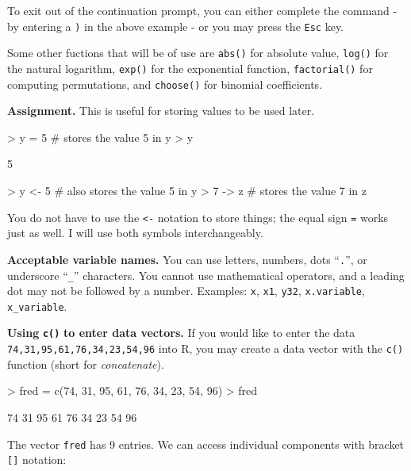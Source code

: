 \documentclass[english]{article}
\renewenvironment{Schunk}{\vspace{\topsep}}{\vspace{\topsep}}
\begin{document}
To exit out of the continuation prompt, you can either complete the
command - by entering a \texttt{)} in the above example
- or you may press the \texttt{Esc} key.

Some other fuctions that will be of use are \texttt{abs()} for absolute
value, \texttt{log()} for the natural logarithm, \texttt{exp()} for
the exponential function, \texttt{factorial()} for computing permutations,
and \texttt{choose()} for binomial coefficients.

\textbf{Assignment.} This is useful for storing values to be used
later.

\begin{Schunk}
\begin{Sinput}
> y = 5    # stores the value 5 in y
> y
\end{Sinput}
\begin{Soutput}
[1] 5
\end{Soutput}
\begin{Sinput}
> y <- 5   # also stores the value 5 in y
> 7 -> z   # stores the value 7 in z
\end{Sinput}
\end{Schunk}

You do not have to use the \texttt{<-} notation to store things; the
equal sign \texttt{=} works just as well. I will use both symbols
interchangeably.

\textbf{Acceptable variable names.} You can use letters, numbers,
dots ``\texttt{.}'', or underscore ``\texttt{\_}'' characters.
You cannot use mathematical operators, and a leading dot may not be
followed by a number. Examples: \texttt{x}, \texttt{x1}, \texttt{y32},
\texttt{x.variable}, \texttt{x\_variable}.

\textbf{Using} \texttt{\textbf{c()}} \textbf{to enter data vectors.}
If you would like to enter the data \texttt{74,31,95,61,76,34,23,54,96}
into \textsf{R}, you may create a data vector with the \texttt{c()}
function (short for \emph{concatenate}). 

\begin{Schunk}
\begin{Sinput}
> fred = c(74, 31, 95, 61, 76, 34, 23, 54, 96)
> fred
\end{Sinput}
\begin{Soutput}
[1] 74 31 95 61 76 34 23 54 96
\end{Soutput}
\end{Schunk}

The vector \texttt{fred} has 9 entries. We can access individual components
with bracket \texttt{[]} notation:
\end{document}
